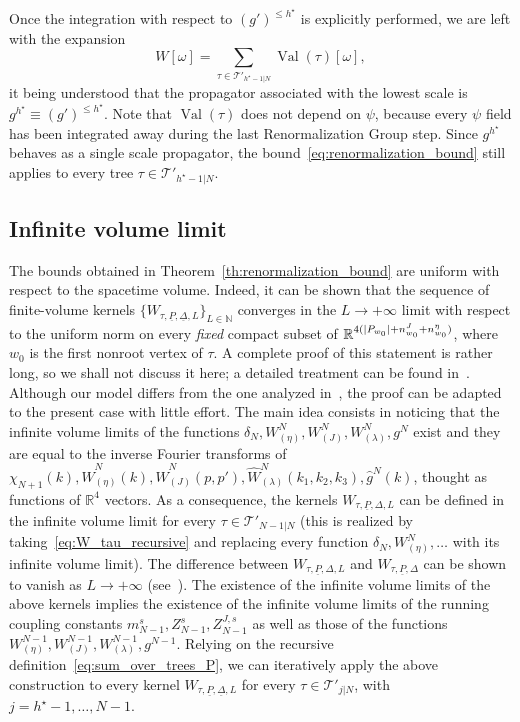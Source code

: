 \documentclass[a4paper, 11pt]{article}
\newcommand{\R}{\mathbb{R}}
\newcommand{\N}{\mathbb{N}}
\newcommand{\sing}[2]{{#1}^{#2}}							%
\newcommand{\trees}{\mathcal{T}}							%
\newcommand{\src}{\omega}									%
\DeclareMathOperator{\val}{Val}								%
\theoremstyle{thm}
\begin{document}
Once the integration with respect to $\sing{(g')}{\le h^\star}$ is explicitly performed, we are left with the expansion
\begin{equation}
W[\src] = \sum_{\tau \in \trees'_{h^\star - 1|N}} \val(\tau)[\src],
\end{equation}
it being understood that the propagator associated with the lowest scale is $\sing{g}{h^\star} \equiv \sing{(g')}{\le h^\star}$. Note that $\val(\tau)$ does not depend on $\psi$, because every $\psi$ field has been integrated away during the last Renormalization Group step. Since $\sing{g}{h^\star}$ behaves as a single scale propagator, the bound~\eqref{eq:renormalization_bound} still applies to every tree $\tau \in \trees'_{h^\star - 1|N}$.

\subsection{Infinite volume limit}
\label{subsec:thermodynamic_limit}

The bounds obtained in Theorem~\ref{th:renormalization_bound} are uniform with respect to the spacetime volume. Indeed, it can be shown that the sequence of finite-volume kernels $\lbrace W_{\tau, \underline{P}, \underline{\Delta}, L} \rbrace_{L \in \N}$ converges in the $L \to +\infty$ limit with respect to the uniform norm on every \emph{fixed} compact subset of $\R^{4(\abs*{P_{w_0}} + n^J_{w_0} + n^\eta_{w_0})}$, where $w_0$ is the first nonroot vertex of $\tau$. A complete proof of this statement is rather long, so we shall not discuss it here; a detailed treatment can be found in~\cite[Appendix D]{Giuliani_Mastropietro_2010}. Although our model differs from the one analyzed in~\cite{Giuliani_Mastropietro_2010}, the proof can be adapted to the present case with little effort. The main idea consists in noticing that the infinite volume limits of the functions $\delta_N, W_{(\eta)}^N, W_{(J)}^N, W_{(\lambda)}^N, \sing{g}{N}$ exist and they are equal to the inverse Fourier transforms of $\chi_{N+1}(k), \hat{W}_{(\eta)}^N(k), \hat{W}_{(J)}^N(p, p'), \hat{W}_{(\lambda)}^N(k_1, k_2, k_3), \sing{\hat{g}}{N}(k)$, thought as functions of $\R^4$ vectors. As a consequence, the kernels $W_{\tau, \underline{P}, \Delta, L}$ can be defined in the infinite volume limit for every $\tau \in \trees'_{N-1|N}$ (this is realized by taking~\eqref{eq:W_tau_recursive} and replacing every function $\delta_N, W_{(\eta)}^N, \dots$ with its infinite volume limit). The difference between $W_{\tau, \underline{P}, \Delta, L}$ and $W_{\tau, \underline{P}, \Delta}$ can be shown to vanish as $L \to +\infty$ (see~\cite[Equations (D.7), (D.8) et seq.]{Giuliani_Mastropietro_2010}). The existence of the infinite volume limits of the above kernels implies the existence of the infinite volume limits of the running coupling constants $m^s_{N-1}, Z^s_{N-1}, Z^{J, s}_{N-1}$ as well as those of the functions $W_{(\eta)}^{N-1}, W_{(J)}^{N-1}, W_{(\lambda)}^{N-1}, \sing{g}{N-1}$. Relying on the recursive definition~\ref{eq:sum_over_trees_P}, we can iteratively apply the above construction to every kernel $W_{\tau, \underline{P}, \underline{\Delta}, L}$ for every $\tau \in \trees'_{j|N}$, with $j = h^\star-1, \dots, N-1$.
\end{document}
